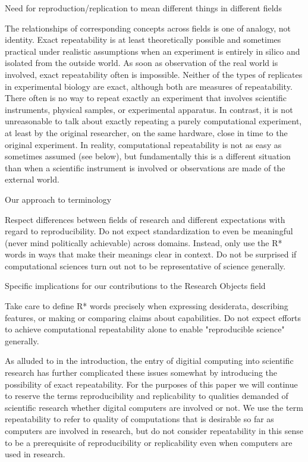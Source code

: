 	Need for reproduction/replication to mean different things in different fields

		The relationships of corresponding concepts across fields is one of analogy, not identity.
		Exact repeatability is at least theoretically possible and sometimes practical under realistic assumptions when an experiment
			is entirely in silico and isolated from the outside world.
		As soon as observation of the real world is involved, exact repeatability often is impossible.
		Neither of the types of replicates in experimental biology are exact, although both are measures of repeatability.
		There often is no way to repeat exactly an experiment that involves scientific instruments, physical samples, or experimental apparatus.
		In contrast, it is not unreasonable to talk about exactly repeating a purely computational experiment, at least by the original researcher,
			on the same hardware, close in time to the original experiment.
		In reality, computational repeatability is not as easy as sometimes assumed (see below), but fundamentally this is
			a different situation than when a scientific instrument is involved or observations are made of the external world.

	Our approach to terminology

		Respect differences between fields of research and different expectations with regard to reproducibility.
		Do not expect standardization to even be meaningful (never mind politically achievable) across domains.
		Instead, only use the R* words in ways that make their meanings clear in context.
		Do not be surprised if computational sciences turn out not to be representative of science generally.

	Specific implications for our contributions to the Research Objects field

		Take care to define R* words precisely when expressing desiderata, describing features, or making or comparing claims about capabilities.
		Do not expect efforts to achieve computational repeatability alone to enable "reproducible science" generally.

As alluded to in the introduction, the entry of digitial computing into scientific research
	has further complicated these issues somewhat by introducing the possibility of exact repeatability.
For the purposes of this paper we will continue to reserve the terms reproducibility and replicability to
	qualities demanded of scientific research whether digital computers are involved or not.
We use the term repeatability to refer to quality of computations that is desirable so far as computers are involved
	in research, but do not consider repeatability in this sense to be a prerequisite of reproducibility or
	replicability even when computers are used in research.

